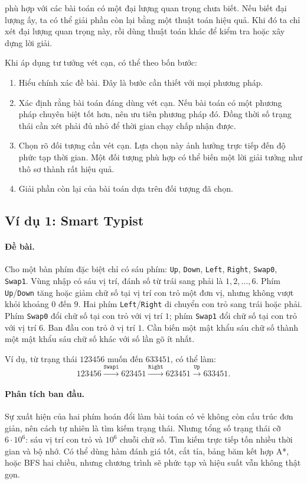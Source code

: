 \documentclass[11pt]{article}
\begin{document}
 phù hợp với các bài toán có một đại lượng quan trọng
chưa biết. Nếu biết đại lượng ấy, ta có thể giải phần còn lại bằng một thuật
toán hiệu quả. Khi đó ta chỉ xét đại lượng quan trọng này, rồi dùng thuật
toán khác để kiểm tra hoặc xây dựng lời giải.

Khi áp dụng tư tưởng vét cạn, có thể theo bốn bước:
\begin{enumerate}
  \item Hiểu chính xác đề bài. Đây là bước cần thiết với mọi phương pháp.
  \item Xác định rằng bài toán đáng dùng vét cạn. Nếu bài toán có một phương
  pháp chuyên biệt tốt hơn, nên ưu tiên phương pháp đó. Đồng thời số trạng
  thái cần xét phải đủ nhỏ để thời gian chạy chấp nhận được.
  \item Chọn rõ đối tượng cần vét cạn. Lựa chọn này ảnh hưởng trực tiếp đến
  độ phức tạp thời gian. Một đối tượng phù hợp có thể biến một lời giải tưởng
  như thô sơ thành rất hiệu quả.
  \item Giải phần còn lại của bài toán dựa trên đối tượng đã chọn.
\end{enumerate}

\subsection{Ví dụ 1: Smart Typist}

\paragraph{Đề bài.}
Cho một bàn phím đặc biệt chỉ có sáu phím: \texttt{Up}, \texttt{Down},
\texttt{Left}, \texttt{Right}, \texttt{Swap0}, \texttt{Swap1}. Vùng nhập có
sáu vị trí, đánh số từ trái sang phải là \(1,2,\ldots,6\). Phím
\texttt{Up}/\texttt{Down} tăng hoặc giảm chữ số tại vị trí con trỏ một đơn vị,
nhưng không vượt khỏi khoảng \(0\) đến \(9\). Hai phím
\texttt{Left}/\texttt{Right} di chuyển con trỏ sang trái hoặc phải. Phím
\texttt{Swap0} đổi chữ số tại con trỏ với vị trí \(1\); phím
\texttt{Swap1} đổi chữ số tại con trỏ với vị trí \(6\). Ban đầu con trỏ ở vị
trí \(1\). Cần biến một mật khẩu sáu chữ số thành một mật khẩu sáu chữ số
khác với số lần gõ ít nhất.

Ví dụ, từ trạng thái \(123456\) muốn đến \(633451\), có thể làm:
\[
123456 \xrightarrow{\texttt{Swap1}} 623451
\xrightarrow{\texttt{Right}} 623451
\xrightarrow{\texttt{Up}} 633451.
\]

\paragraph{Phân tích ban đầu.}
Sự xuất hiện của hai phím hoán đổi làm bài toán có vẻ không còn cấu trúc đơn
giản, nên cách tự nhiên là tìm kiếm trạng thái. Nhưng tổng số trạng thái cỡ
\(6\cdot 10^6\): sáu vị trí con trỏ và \(10^6\) chuỗi chữ số. Tìm kiếm trực
tiếp tốn nhiều thời gian và bộ nhớ. Có thể dùng hàm đánh giá tốt, cắt tỉa,
bảng băm kết hợp A*, hoặc BFS hai chiều, nhưng chương trình sẽ phức tạp và
hiệu suất vẫn không thật gọn.
\end{document}
